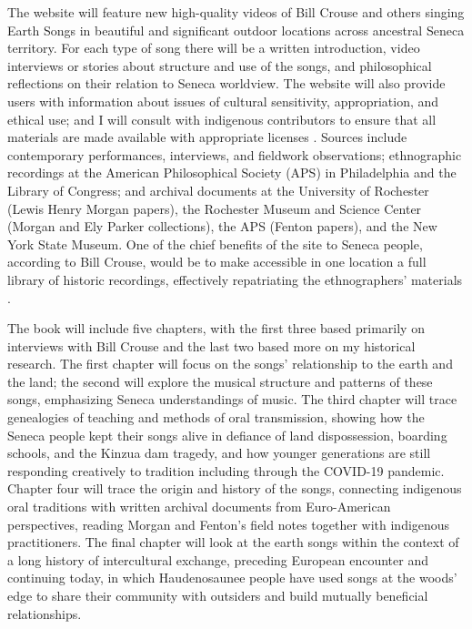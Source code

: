 \documentclass{neh}
\begin{document}
The website will feature new high-quality videos of Bill Crouse and others
singing Earth Songs in beautiful and significant outdoor locations
across ancestral Seneca territory.
For each type of song there will be a written introduction, video interviews
or stories about structure and use of the songs, and philosophical reflections
on their relation to Seneca worldview.
The website will also provide users with information about issues of cultural
sensitivity, appropriation, and ethical use; and I will consult with
indigenous contributors to ensure that all materials are made available with
appropriate licenses
\Autocite{Christen:RelationshipsNotRecords}.
Sources include contemporary performances, interviews, and fieldwork
observations; ethnographic recordings at the American Philosophical Society
(APS) in Philadelphia and the Library of Congress; and archival
documents at the University of Rochester (Lewis Henry Morgan papers), the
Rochester Museum and Science Center (Morgan and Ely Parker collections), the
APS (Fenton papers), and the New York State Museum.
One of the chief benefits of the site to Seneca people, according to Bill
Crouse, would be to make accessible in one location a full library of
historic recordings, effectively repatriating the ethnographers' materials 
\Autocite{Fox:Repatriation}.

The book will include five chapters, with the first three based primarily on
interviews with Bill Crouse and the last two based more on my historical
research.
The first chapter will focus on the songs' relationship to the earth and the
land; the second will explore the musical structure and patterns of these
songs, emphasizing Seneca understandings of music.
The third chapter will trace genealogies of teaching and methods of oral
transmission, showing how the Seneca people kept their songs alive in defiance
of land dispossession, boarding schools, and the Kinzua dam tragedy, and how
younger generations are still responding creatively to tradition including
through the COVID-19 pandemic.
Chapter four will trace the origin and history of the songs, connecting
indigenous oral traditions with written archival documents from Euro-American
perspectives, reading Morgan and Fenton's field notes together with indigenous
practitioners.
The final chapter will look at the earth songs within the context of a long
history of intercultural exchange, preceding European encounter and continuing
today, in which Haudenosaunee people have used songs at the woods' edge to
share their community with outsiders and build mutually beneficial
relationships.
\end{document}
